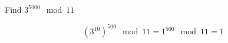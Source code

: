 \question Find $3^{5000} \mod 11$
\begin{solution}[1 in]
\[(3^{10})^{500}  \mod 11 = 1^{500} \mod 11 = 1\]
\end{solution}